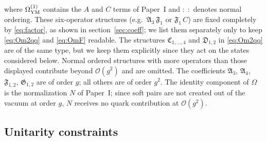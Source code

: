 \documentclass[11pt,a4paper]{article}
\numberwithin{equation}{section}
\newcommand{\mf}[1]{\mathfrak{#1}}
\newcommand{\OM}{\Omega}
\newcommand{\order}[1]{\mathcal{O}(#1)}
\begin{document}
where $\OM^{(1)}_{\rm YM}$ contains the $A$ and $C$ terms of Paper~I and $:\;:$ denotes normal
ordering. These six-operator structures (e.g.\ $\mf A_{3}\,\mf F_{1}$ or $\mf F_{1}\,C$) are fixed
completely by \eqref{eq:factor}, as shown in section~\ref{sec:coeff}; we list them separately
only to keep \eqref{eq:Om2qq} and \eqref{eq:OmF} readable. The structures $\mf C_{1,\dots,4}$ and
$\mf D_{1,2}$ in \eqref{eq:Om2qq} are of the same type, but we keep them explicitly since they act
on the states considered below. Normal ordered structures with more operators than those displayed
contribute beyond $\order{g^{2}}$ and are omitted. The coefficients $\mf A_{3}$, $\mf A_{4}$,
$\mf F_{1,2}$, $\mf G_{1,2}$ are of order $g$; all others are of order $g^{2}$. The identity
component of $\OM$ is the normalization $N$ of Paper~I; since soft pairs are not created out of
the vacuum at order $g$, $N$ receives no quark contribution at $\order{g^{2}}$.

\subsection*{Unitarity constraints}
\label{sec:unitarity}
\end{document}
